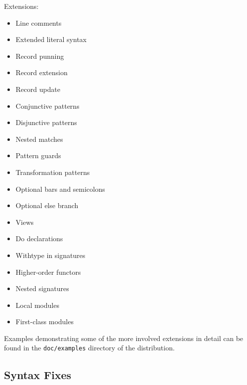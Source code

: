 \documentclass[twoside,titlepage]{article}
\begin{document}
\begin{appendix}
Extensions:
\begin{itemize}
\setlength{\itemsep}{0em}
\item Line comments
\item Extended literal syntax
\item Record punning
\item Record extension
\item Record update
\item Conjunctive patterns
\item Disjunctive patterns
\item Nested matches
\item Pattern guards
\item Transformation patterns
\item Optional bars and semicolons
\item Optional else branch
\item Views
\item Do declarations
\item Withtype in signatures
\item Higher-order functors
\item Nested signatures
\item Local modules
\item First-class modules
\end{itemize}

Examples demonstrating some of the more involved extensions in detail can be found in the {\tt doc/examples} directory of the distribution.


\subsection{Syntax Fixes}
\label{ext-syntaxfixes}


\end{appendix}
\end{document}
